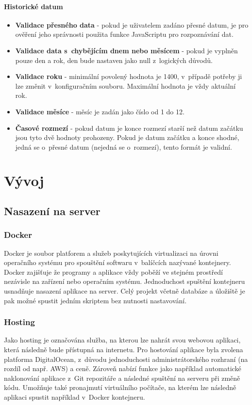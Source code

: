 \documentclass[12pt, a4paper,
  oneside,      %
]{report}
\begin{document}
\subsubsection{Historické datum}
\begin{itemize}
	\item \textbf{Validace přesného data} - pokud je uživatelem zadáno přesné datum, je pro ověření jeho správnosti použita funkce JavaScriptu pro rozpoznávání dat.
	\item \textbf{Validace data s~chybějícím dnem nebo měsícem} - pokud je vyplněn pouze den a rok, den bude nastaven jako null z~logických důvodů.
	\item \textbf{Validace roku} - minimální povolený hodnota je 1400, v~případě potřeby ji lze změnit v~konfiguračním souboru. Maximální hodnota je vždy aktuální rok.
	\item \textbf{Validace měsíce} - měsíc je zadán jako číslo od 1 do 12.
	\item \textbf{Časové rozmezí} - pokud datum je konce rozmezí starší než datum začátku jsou tyto dvě hodnoty prohozeny. Pokud je datum začátku a konce shodné, jedná se o~přesné datum (nejedná se o~rozmezí), tento formát je validní.
\end{itemize}


\chapter{Vývoj}
\section{Nasazení na server}
\subsection{Docker}
Docker je soubor platforem a služeb poskytujících virtualizaci na úrovni operačního systému pro spouštění softwaru v~balíčcích nazývané kontejnery. Docker zajišťuje že programy a aplikace vždy poběží ve stejném prostředí nezávisle na zařízení nebo operačním systému. Jednoduchost spuštění kontejneru usnadňuje nasazení aplikace na server. Celý projekt včetně databáze a úložiště je pak možné spustit jedním skriptem bez nutnosti nastavování.
\subsection{Hosting}
Jako hosting je označována služba, na kterou lze nahrát svou webovou aplikaci, která následně bude přístupná na internetu. Pro hostování aplikace byla zvolena platforma DigitalOcean, z~důvodu jednoduchosti administrátorského rozhraní (na rozdíl od např. AWS) a ceně. Zároveň nabízí funkce jako například automatické naklonování aplikace z~Git repozitáře a následné spuštění na serveru při změně kódu. Umožňuje také pronajmutí virtuálního počítače, na kterém lze následně aplikaci spustit například v~Docker kontejneru.
\end{document}
